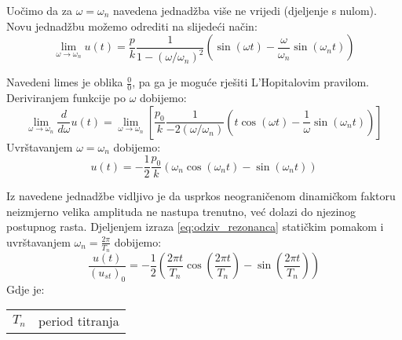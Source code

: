 Uočimo da za $\omega = \omega_n$ navedena jednadžba više ne vrijedi (djeljenje s
nulom). Novu jednadžbu možemo odrediti na slijedeći način:
\begin{equation}\label{eq:limes}
    \lim_{\omega\to\omega_n}{u(t)} = 
        \frac{p}{k}\frac{1}{1-(\omega/\omega_n)^2}
            \left(\sin(\omega t) - \frac{\omega}{\omega_n}\sin(\omega_n t)\right)
\end{equation}

Navedeni limes je oblika $\frac{0}{0}$, pa ga je moguće rješiti L'Hopitalovim
pravilom. Deriviranjem funkcije po $\omega$ dobijemo:
\begin{equation}\label{eq:lhopitalovo_limes}
    \lim_{\omega\to\omega_n}\frac{d}{d\omega}u(t)=
    \lim_{\omega\to\omega_n} \left[
        \frac{p_0}{k}\frac{1}{-2(\omega/\omega_n)}
            \left(t\cos(\omega t) - \frac{1}{\omega}\sin(\omega_n t)\right)
           \right]
\end{equation}
Uvrštavanjem $\omega=\omega_n$ dobijemo:
\begin{equation}\label{eq:odziv_rezonanca}
    u(t)=-\frac{1}{2}\frac{p_0}{k}(\omega_n\cos(\omega_n t)-\sin(\omega_nt))
\end{equation}

Iz navedene jednadžbe vidljivo je da usprkos neograničenom dinamičkom faktoru
neizmjerno velika amplituda ne nastupa trenutno, već dolazi do njezinog 
postupnog rasta. Djeljenjem izraza \eqref{eq:odziv_rezonanca} statičkim pomakom i
uvrštavanjem $\omega_n=\frac{2\pi}{T_n}$ dobijemo:
\begin{equation}\label{eq:rezonanca_period}
    \frac{u(t)}{(u_{st})_0}=-\frac{1}{2}
        \left(\frac{2\pi t}{T_n}
                \cos\left(\frac{2\pi t}{T_n}\right)
                -
                \sin\left(\frac{2\pi t}{T_n}\right)
        \right)
\end{equation}
Gdje je:
\begin{table}[H]
    \begin{tabular} {r l}
        $T_n$ & period titranja\\
    \end{tabular}
\end{table}


